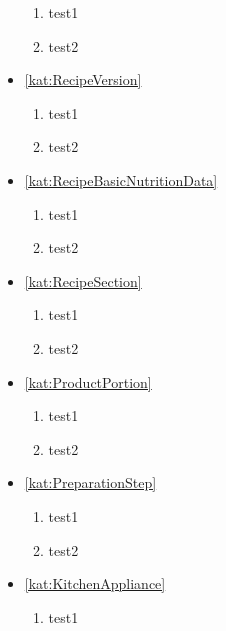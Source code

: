 \begin{itemize}[label={\textbf{Reguły dla}}, wide, labelwidth=!, labelindent=0pt]
    \begin{enumerate}[label={\textbf{REG/\protect\threedigits{\arabic{enumi}}}}, wide, labelwidth=!, resume]
        \item test1
        \item test2
    \end{enumerate}
    \item\ref{kat:RecipeVersion}
    \begin{enumerate}[label={\textbf{REG/\protect\threedigits{\arabic{enumi}}}}, wide, labelwidth=!, resume]
        \item test1
        \item test2
    \end{enumerate}
    \item\ref{kat:RecipeBasicNutritionData}
    \begin{enumerate}[label={\textbf{REG/\protect\threedigits{\arabic{enumi}}}}, wide, labelwidth=!, resume]
        \item test1
        \item test2
    \end{enumerate}
    \item\ref{kat:RecipeSection}
    \begin{enumerate}[label={\textbf{REG/\protect\threedigits{\arabic{enumi}}}}, wide, labelwidth=!, resume]
        \item test1
        \item test2
    \end{enumerate}
    \item\ref{kat:ProductPortion}
    \begin{enumerate}[label={\textbf{REG/\protect\threedigits{\arabic{enumi}}}}, wide, labelwidth=!, resume]
        \item test1
        \item test2
    \end{enumerate}
    \item\ref{kat:PreparationStep}
    \begin{enumerate}[label={\textbf{REG/\protect\threedigits{\arabic{enumi}}}}, wide, labelwidth=!, resume]
        \item test1
        \item test2
    \end{enumerate}
    \item\ref{kat:KitchenAppliance}
    \begin{enumerate}[label={\textbf{REG/\protect\threedigits{\arabic{enumi}}}}, wide, labelwidth=!, resume]
        \item test1

\end{enumerate}
\end{itemize}
